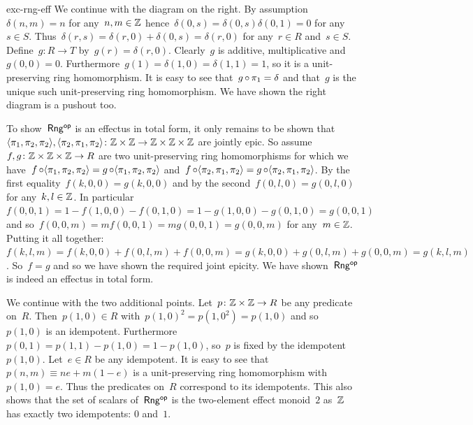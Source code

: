 \begin{solution}{exc-rng-eff}
We continue with the diagram on the right.
By assumption~$\delta(n,m) = n$ for any~$n,m \in \mathbb{Z}$
    hence~$\delta(0,s) = \delta(0,s)\delta(0,1) = 0$ for any~$s\in S$.
Thus~$\delta(r,s) = \delta(r,0) + \delta(0,s) = \delta(r,0)$
    for any~$r \in R$ and~$s \in S$.
Define~$g\colon R \to T$ by~$g(r) = \delta(r,0)$.
Clearly~$g$ is additive, multiplicative and~$g(0,0) = 0$.
Furthermore~$g(1) = \delta(1,0) = \delta(1,1) = 1$,
    so it is a unit-preserving ring homomorphism.
It is easy to see that~$g \mathop{\circ} \pi_1 = \delta$ and that~$g$
    is the unique such unit-preserving ring homomorphism.
We have shown the right diagram is a pushout too.

To show~${\mathsf{Rng}}{^{\mathsf{op}}}$ is an effectus in total form,
    it only remains to be shown that~$
        \langle \pi_1, \pi_2,\pi_2\rangle,
        \langle \pi_2, \pi_1,\pi_2\rangle
        \colon \mathbb{Z}\times\mathbb{Z}
            \to \mathbb{Z}\times\mathbb{Z}\times\mathbb{Z}$ are jointly epic.
    So assume~$f,g\colon \mathbb{Z}\times\mathbb{Z}\times\mathbb{Z} \to R$
        are two unit-preserving ring homomorphisms
        for which we have~$f \mathop{\circ} \langle \pi_1, \pi_2,\pi_2\rangle  =
        g \mathop{\circ} \langle \pi_1, \pi_2,\pi_2\rangle$
        and~$f \mathop{\circ} \langle \pi_2, \pi_1,\pi_2\rangle =
        g \mathop{\circ} \langle \pi_2, \pi_1,\pi_2\rangle$.
    By the first equality~$f(k,0,0) = g(k,0,0)$
        and by the second~$f(0,l,0) = g(0,l,0)$
            for any~$k,l \in \mathbb{Z}$.
In particular~$f(0,0,1) = 1-f(1,0,0) - f(0,1,0)
    = 1 - g(1,0,0) - g(0,1,0) = g(0,0,1)$
        and so~$f(0,0,m) = m f(0,0,1) = m g(0,0,1) = g(0,0,m)$
            for any~$m \in \mathbb{Z}$.
    Putting it all together: $f(k,l,m) 
            = f(k,0,0) + f(0,l,m) + f(0,0,m)
            = g(k,0,0) + g(0,l,m) + g(0,0,m) = g(k,l,m)$.
    So~$f=g$ and so we have shown the required joint epicity.
We have shown~${\mathsf{Rng}}{^{\mathsf{op}}}$ is indeed an effectus in total form.

We continue with the two additional points.
Let~$p \colon \mathbb{Z}\times\mathbb{Z} \to R$ be any predicate on~$R$.
Then~$p(1,0) \in R$ with~$p(1,0)^2 = p(1,0^2) = p(1,0)$ and so~$p(1,0)$
    is an idempotent.
    Furthermore~$p(0,1) = p(1,1) - p(1,0) = 1 - p(1,0)$,
        so~$p$ is fixed by the idempotent~$p(1,0)$.
Let~$e \in R$ be any idempotent.
It is easy to see that~$p(n,m) \equiv ne + m(1-e)$ is a unit-preserving
    ring homomorphism with~$p(1,0) = e$.  Thus the predicates
        on~$R$ correspond to its idempotents.
    This also shows that the set of scalars of~${\mathsf{Rng}}{^{\mathsf{op}}}$
        is the two-element effect monoid~$2$
        as~$\mathbb{Z}$ has exactly two idempotents: $0$ and~$1$.


\end{solution}
